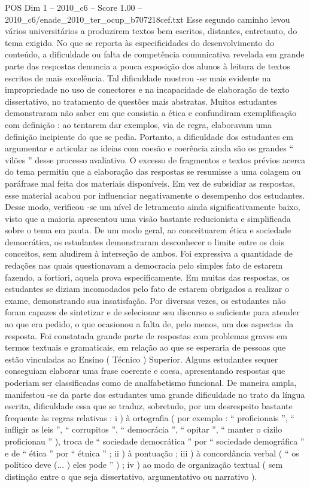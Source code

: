 \begin{textsample}{POS Dim 1 – 2010\_c6 – Score 1.00 – 2010\_c6/enade\_2010\_ter\_ocup\_b707218cef.txt}
Esse segundo caminho levou vários universitários a produzirem textos bem escritos, distantes, entretanto, do tema exigido.
No que se reporta às especificidades do desenvolvimento do conteúdo, a dificuldade ou falta de competência comunicativa revelada em grande parte das respostas denuncia a pouca exposição dos alunos à leitura de textos escritos de mais excelência.
Tal dificuldade mostrou -se mais evidente na impropriedade no uso de conectores e na incapacidade de elaboração de texto dissertativo, no tratamento de questões mais abstratas.
Muitos estudantes demonstraram não saber em que consistia a ética e confundiram exemplificação com definição : ao tentarem dar exemplos, via de regra, elaboravam uma definição incipiente do que se pedia.
Portanto, a dificuldade dos estudantes em argumentar e articular as ideias com coesão e coerência ainda são os grandes “ vilões ” desse processo avaliativo.
O excesso de fragmentos e textos prévios acerca do tema permitiu que a elaboração das respostas se resumisse a uma colagem ou paráfrase mal feita dos materiais disponíveis.
Em vez de subsidiar as respostas, esse material acabou por influenciar negativamente o desempenho dos estudantes.
Desse modo, verificou -se um nível de letramento ainda significativamente baixo, visto que a maioria apresentou uma visão bastante reducionista e simplificada sobre o tema em pauta.
De um modo geral, ao conceituarem ética e sociedade democrática, os estudantes demonstraram desconhecer o limite entre os dois conceitos, sem aludirem à interseção de ambos.
Foi expressiva a quantidade de redações nas quais questionavam a democracia pelo simples fato de estarem fazendo, a fortiori, aquela prova especificamente.
Em muitas das respostas, os estudantes se diziam incomodados pelo fato de estarem obrigados a realizar o exame, demonstrando sua insatisfação.
Por diversas vezes, os estudantes não foram capazes de sintetizar e de selecionar seu discurso o suficiente para atender ao que era pedido, o que ocasionou a falta de, pelo menos, um dos aspectos da resposta.
Foi constatada grande parte de respostas com problemas graves em termos textuais e gramaticais, em relação ao que se esperaria de pessoas que estão vinculadas ao Ensino ( Técnico ) Superior.
Alguns estudantes sequer conseguiam elaborar uma frase coerente e coesa, apresentando respostas que poderiam ser classificadas como de analfabetismo funcional.
De maneira ampla, manifestou -se da parte dos estudantes uma grande dificuldade no trato da língua escrita, dificuldade essa que se traduz, sobretudo, por um desrespeito bastante frequente às regras relativas : i ) à ortografia ( por exemplo : “ proficionais ”, “ infligir as leis ”, “ corrupitos ”, “ democrácia ”, “ opitar ”, “ manter o cizilo proficionau ” ), troca de “ sociedade democrática ” por “ sociedade demográfica ” e de “ ética ” por “ étnica ” ; ii ) à pontuação ; iii ) à concordância verbal ( “ os político deve (... ) eles pode ” ) ; iv ) ao modo de organização textual ( sem distinção entre o que seja dissertativo, argumentativo ou narrativo ).

\end{textsample}
